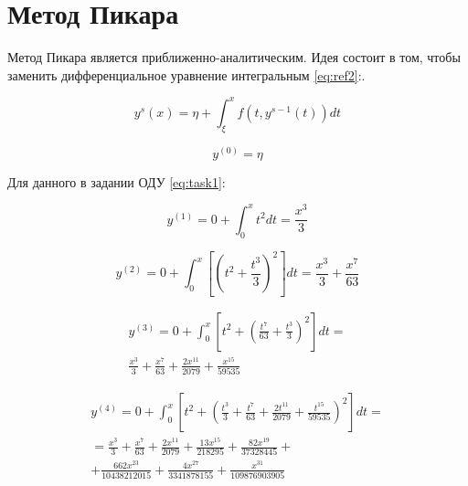 \documentclass[12pt]{report}
\begin{document}
\section{Метод Пикара}

Метод Пикара является приближенно-аналитическим. Идея состоит в том, чтобы заменить дифференциальное уравнение интегральным \ref{eq:ref2}:.


\begin{equation}
	y^{s}(x) = \eta + \int_{\xi}^{x} f(t, y^{s-1}(t)) dt
	\label{eq:ref2}
\end{equation}

\begin{equation}
	y^{(0)} = \eta
\end{equation}


Для данного в задании ОДУ \ref{eq:task1}:

\begin{equation}
	y^{(1)} = 0 + \int_{0}^{x} t^2 dt= \frac{x^3}{3} 
\end{equation}

\begin{equation}
	y^{(2)} = 0 + \int_{0}^{x}\left[ \left( t^2 + \frac{t^3}{3} \right)^2 \right] dt = \frac{x^3}{3} + \frac{x^7}{63}
\end{equation}

\begin{equation}
	\begin{split}
		y^{(3)} = 0 + \int_{0}^{x}\left[t^2 + \left(\frac{t^7}{63} + \frac{t^3}{3} \right)^2\right] dt = \\ 
		\frac{x^3}{3} + \frac{x^7}{63} + \frac{2x^{11}}{2079} + \frac{x^{15}}{59535}
	\end{split}
\end{equation}

\begin{equation}
	\begin{split}
		y^{(4)} = 0 + \int_{0}^{x}\left[t^2 + \left( \frac{t^3}{3} + \frac{t^7}{63} + \frac{2t^{11}}{2079} + \frac{t^{15}}{59535} \right)^2 \right] dt = \\ 
		= \frac{x^3}{3} + \frac{x^{7}}{63} + \frac{2x^{11}}{2079} + \frac{13x^{15}}{218295} + \frac{82x^{19}}{37328445} + \\
		+ \frac{662x^{23}}{10438212015} + \frac{4x^{27}}{3341878155} + \frac{x^{31}}{109876903905}
	\end{split}
\end{equation}
\end{document}
